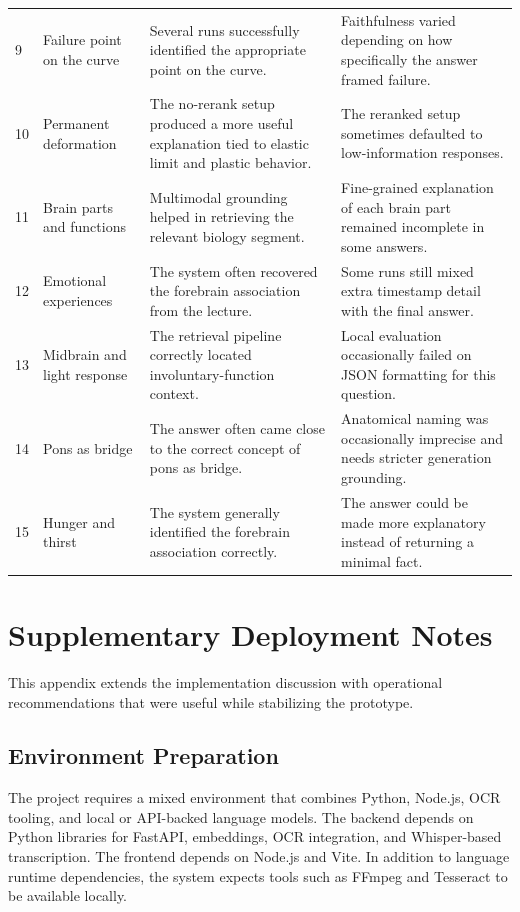 \documentclass[12pt,a4paper,oneside]{report}
\begin{document}
\begin{longtable}{p{} p{} p{} p{}}
9 & Failure point on the curve & Several runs successfully identified the appropriate point on the curve. & Faithfulness varied depending on how specifically the answer framed failure. \\
10 & Permanent deformation & The no-rerank setup produced a more useful explanation tied to elastic limit and plastic behavior. & The reranked setup sometimes defaulted to low-information responses. \\
11 & Brain parts and functions & Multimodal grounding helped in retrieving the relevant biology segment. & Fine-grained explanation of each brain part remained incomplete in some answers. \\
12 & Emotional experiences & The system often recovered the forebrain association from the lecture. & Some runs still mixed extra timestamp detail with the final answer. \\
13 & Midbrain and light response & The retrieval pipeline correctly located involuntary-function context. & Local evaluation occasionally failed on JSON formatting for this question. \\
14 & Pons as bridge & The answer often came close to the correct concept of pons as bridge. & Anatomical naming was occasionally imprecise and needs stricter generation grounding. \\
15 & Hunger and thirst & The system generally identified the forebrain association correctly. & The answer could be made more explanatory instead of returning a minimal fact. \\
\bottomrule
\end{longtable}

\chapter{Supplementary Deployment Notes}
This appendix extends the implementation discussion with operational recommendations that were useful while stabilizing the prototype.

\section*{Environment Preparation}
The project requires a mixed environment that combines Python, Node.js, OCR tooling, and local or API-backed language models. The backend depends on Python libraries for FastAPI, embeddings, OCR integration, and Whisper-based transcription. The frontend depends on Node.js and Vite. In addition to language runtime dependencies, the system expects tools such as FFmpeg and Tesseract to be available locally.
\end{document}
